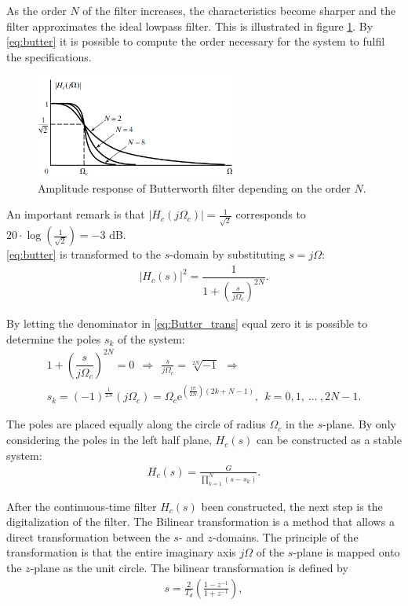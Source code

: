 As the order $N$ of the filter increases, the characteristics become sharper and the filter approximates the ideal lowpass filter. This is illustrated in figure \ref{fig:butter}. By \eqref{eq:butter} it is possible to compute the order necessary for the system to fulfil the specifications.            
\begin{figure}[H]
    \centering
    \includegraphics[width = 0.6\textwidth]{figures/butterworth.png}
    \caption{Amplitude response of Butterworth filter depending on the order $N$.}
    \label{fig:butter}
\end{figure}

An important remark is that $|H_c(j\Omega_c)| = \frac{1}{\sqrt{2}}$ corresponds to $20\cdot \log\left(\frac{1}{\sqrt{2}}\right) = -3$ dB. \\
\eqref{eq:butter} is transformed to the $s$-domain by substituting $s = j\Omega$:
\begin{align} \label{eq:Butter_trans}
|H_c(s)|^2 = \dfrac{1}{1+\left( \frac{s}{j\Omega_c}\right)^{2N}}.
\end{align}

By letting the denominator in \eqref{eq:Butter_trans} equal zero it is possible to determine the poles $s_k$ of the system:
\begin{align*}
1+\left( \dfrac{s}{j\Omega_c}\right)^{2N} = 0 \ \  \Rightarrow  \ \ \frac{s}{j \Omega_c} = \sqrt[2N]{-1} \ \
\Rightarrow \\
s_k = (-1)^{\frac{1}{2N}} \left( j\Omega_c \right) = \Omega_c\text{e}^{ \left( \frac{j\pi}{2N} \right) \left( 2k+ N-1 \right) }, \ \ k=0,1,\ ... \ , 2N-1.
\end{align*}

The poles are placed equally along the circle of radius $\Omega_c$ in the $s$-plane. By only considering the poles in the left half plane, $H_c(s)$ can be constructed as a stable system:
\begin{align*}
H_c(s)=\frac{G}{\prod_{k=1}^{N}(s-s_k)}.
\end{align*}

After the continuous-time filter $H_c(s)$ been constructed, the next step is the digitalization of the filter. The Bilinear transformation is a method that allows a direct transformation between the $s$- and $z$-domains. The principle of the transformation is that the entire imaginary axis $j\Omega$ of the $s$-plane is mapped onto the $z$-plane as the unit circle. The bilinear transformation is defined by 
\begin{align}
s=\frac{2}{T_d}\left(\frac{1-z^{-1}}{1+z^{-1}}\right), 
\end{align}

